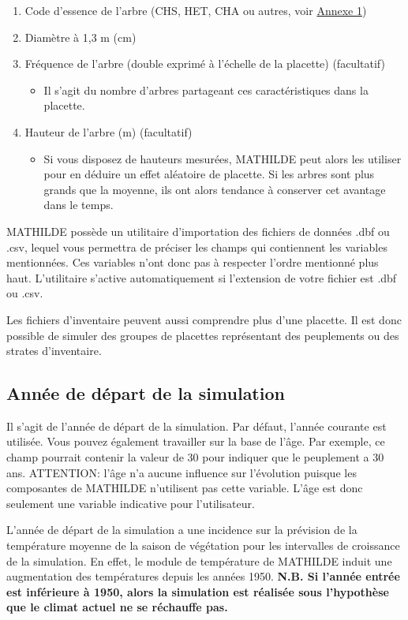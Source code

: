 \documentclass[a4paper,12pt]{article}
\begin{document}
\begin{enumerate}
\begin{itemize}
    \end{itemize}   
    \item Code d'essence de l'arbre (CHS, HET, CHA ou autres, voir \hyperref[Annexe1]{Annexe 1})
	\item Diamètre à 1,3 m (cm)
  	\item Fréquence de l'arbre (double exprimé à l'échelle de la placette) (facultatif)
    \begin{itemize}
	\item Il s'agit du nombre d'arbres partageant ces caractéristiques dans la placette. 
    \end{itemize} 
	\item Hauteur de l'arbre (m) (facultatif)
    \begin{itemize}
	\item Si vous disposez de hauteurs mesurées, MATHILDE peut alors les utiliser pour en déduire un effet aléatoire de placette. Si les arbres sont plus grands que la moyenne, ils ont alors tendance à conserver cet avantage dans le temps.
	\end{itemize}     
\end{enumerate}
  
MATHILDE possède un utilitaire d'importation des fichiers de données .dbf ou .csv, lequel vous permettra de préciser les champs qui contiennent les variables mentionnées. Ces variables n'ont donc pas à respecter l'ordre mentionné plus haut. L'utilitaire s'active automatiquement si l'extension de votre fichier est .dbf ou .csv.

Les fichiers d'inventaire peuvent aussi comprendre plus d'une placette. Il est donc possible de simuler des groupes de placettes représentant des peuplements ou des strates d'inventaire.

\subsection{Année de départ de la simulation}

Il s'agit de l'année de départ de la simulation. Par défaut, l'année courante est utilisée. Vous pouvez également travailler sur la base de l'âge. Par exemple, ce champ pourrait contenir la valeur de 30 pour indiquer que le peuplement a 30 ans. ATTENTION: l'âge n'a aucune influence sur l'évolution puisque les composantes de MATHILDE n'utilisent pas cette variable. L'âge est donc seulement une variable indicative pour l'utilisateur. 

L'année de départ de la simulation a une incidence sur la prévision de la température moyenne de la saison de végétation pour les intervalles de croissance de la simulation. En effet, le module de température de MATHILDE induit une augmentation des températures depuis les années 1950. \textbf{N.B. Si l'année entrée est inférieure à 1950, alors la simulation est réalisée sous l'hypothèse que le climat actuel ne se réchauffe pas.}
\end{document}
